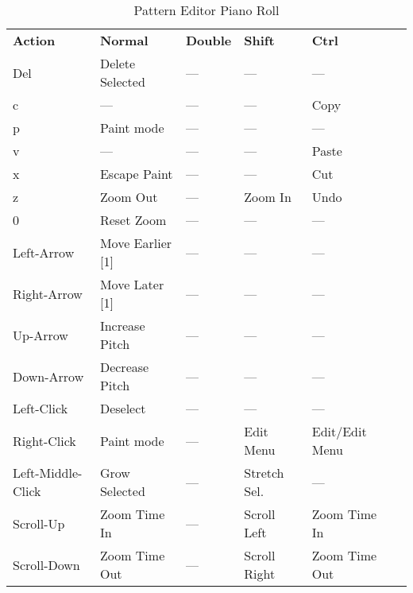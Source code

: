   \begin{table}[H]
      \centering
      \caption{Pattern Editor Piano Roll}
      \label{table:pattern_editor_piano_roll}
      \begin{tabular}{l l l l l l}
         \textbf{Action}   & \textbf{Normal} & \textbf{Double}    & \textbf{Shift} & \textbf{Ctrl}    \\
         Del               & Delete Selected & ---                & ---            & ---              \\
         c                 & ---             & ---                & ---            & Copy             \\
         p                 & Paint mode      & ---                & ---            & ---              \\
         v                 & ---             & ---                & ---            & Paste            \\
         x                 & Escape Paint    & ---                & ---            & Cut              \\
         z                 & Zoom Out        & ---                & Zoom In        & Undo             \\
         0                 & Reset Zoom      & ---                & ---            & ---              \\
         Left-Arrow        & Move Earlier [1] & ---               & ---            & ---              \\
         Right-Arrow       & Move Later [1]  & ---                & ---            & ---              \\
         Up-Arrow          & Increase Pitch  & ---                & ---            & ---              \\
         Down-Arrow        & Decrease Pitch  & ---                & ---            & ---              \\
         Left-Click        & Deselect        & ---                & ---            & ---              \\
         Right-Click       & Paint mode      & ---                & Edit Menu      & Edit/Edit Menu   \\
         Left-Middle-Click & Grow Selected   & ---                & Stretch Sel.   & ---              \\
         Scroll-Up         & Zoom Time In    & ---                & Scroll Left    & Zoom Time In     \\
         Scroll-Down       & Zoom Time Out   & ---                & Scroll Right   & Zoom Time Out    \\
      \end{tabular}
   \end{table}

